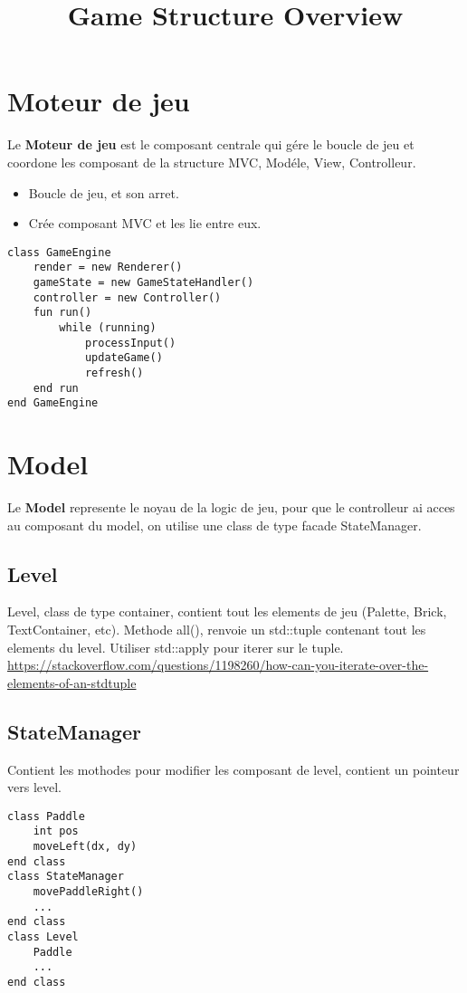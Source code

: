 \documentclass{article}
\title{Game Structure Overview}
\author{}
\date{}
\begin{document}
\maketitle

\section{Moteur de jeu}
Le \textbf{Moteur de jeu} est le composant centrale qui gére le boucle de jeu et coordone les composant de la structure MVC, Modéle, View, Controlleur.

\begin{itemize}
    \item Boucle de jeu, et son arret.
    \item Crée composant MVC et les lie entre eux.
\end{itemize}

\begin{center}
    \begin{minipage}[c]{0.5\textwidth}
        \begin{verbatim}
class GameEngine
    render = new Renderer()
    gameState = new GameStateHandler()
    controller = new Controller()
    fun run()
        while (running)
            processInput()
            updateGame()
            refresh()
    end run
end GameEngine
        \end{verbatim}
    \end{minipage}
\end{center}

\section{Model}
Le \textbf{Model} represente le noyau de la logic de jeu, pour que le controlleur ai acces au composant du model, on utilise une class de type facade StateManager.

\subsection{Level}
Level, class de type container, contient tout les elements de jeu (Palette, Brick, TextContainer, etc).
Methode all(), renvoie un std::tuple contenant tout les elements du level.
Utiliser std::apply pour iterer sur le tuple.
\url{https://stackoverflow.com/questions/1198260/how-can-you-iterate-over-the-elements-of-an-stdtuple}
\subsection{StateManager}
Contient les mothodes pour modifier les composant de level, contient un pointeur vers level.
\begin{center}
    \begin{minipage}[c]{0.5\textwidth}
        \begin{verbatim}
class Paddle
    int pos
    moveLeft(dx, dy)
end class
class StateManager
    movePaddleRight()
    ...
end class
class Level
    Paddle
    ...
end class
        \end{verbatim}
    \end{minipage}
\end{center}
\end{document}
